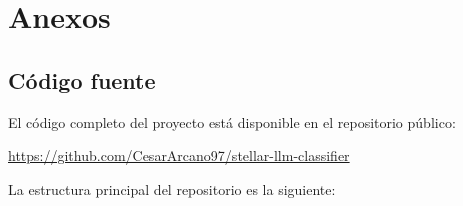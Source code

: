 \section{Anexos}
\label{sec:anexos}

\subsection{Código fuente}
\label{sec:codigo}

El código completo del proyecto está disponible en el repositorio público:

\begin{center}
  \url{https://github.com/CesarArcano97/stellar-llm-classifier}
\end{center}

La estructura principal del repositorio es la siguiente:

